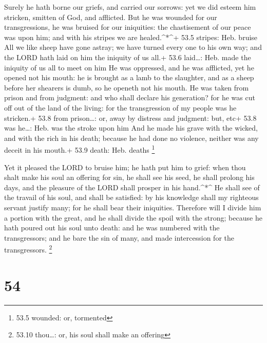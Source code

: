 Surely he hath borne our griefs, and carried our sorrows:
yet we did esteem him stricken, smitten of God, and afflicted.
 But he was wounded for our transgressions, he was bruised
for our iniquities: the chastisement of our peace was upon him; and with
his stripes we are healed.\^{}*\^{}+ 53.5 stripes: Heb. bruise
 All we like sheep have gone astray; we have turned every
one to his own way; and the LORD hath laid on him the iniquity of us
all.+ 53.6 laid\ldots: Heb. made the iniquity of us all to meet on him
 He was oppressed, and he was afflicted, yet he opened not
his mouth: he is brought as a lamb to the slaughter, and as a sheep
before her shearers is dumb, so he openeth not his mouth. 
He was taken from prison and from judgment: and who shall declare his
generation? for he was cut off out of the land of the living: for the
transgression of my people was he stricken.+ 53.8 from prison\ldots: or,
away by distress and judgment: but, etc+ 53.8 was he\ldots: Heb. was the
stroke upon him  And he made his grave with the wicked, and
with the rich in his death; because he had done no violence, neither was
any deceit in his mouth.+ 53.9 death: Heb. deaths \footnote{53.5
  wounded: or, tormented}

 Yet it pleased the LORD to bruise him; he hath put him to
grief: when thou shalt make his soul an offering for sin, he shall see
his seed, he shall prolong his days, and the pleasure of the LORD shall
prosper in his hand.\^{}*\^{}  He shall see of the travail
of his soul, and shall be satisfied: by his knowledge shall my righteous
servant justify many; for he shall bear their iniquities. 
Therefore will I divide him a portion with the great, and he shall
divide the spoil with the strong; because he hath poured out his soul
unto death: and he was numbered with the transgressors; and he bare the
sin of many, and made intercession for the transgressors. \footnote{53.10
  thou\ldots: or, his soul shall make an offering}

\hypertarget{section-53}{%
\section{54}\label{section-53}}

